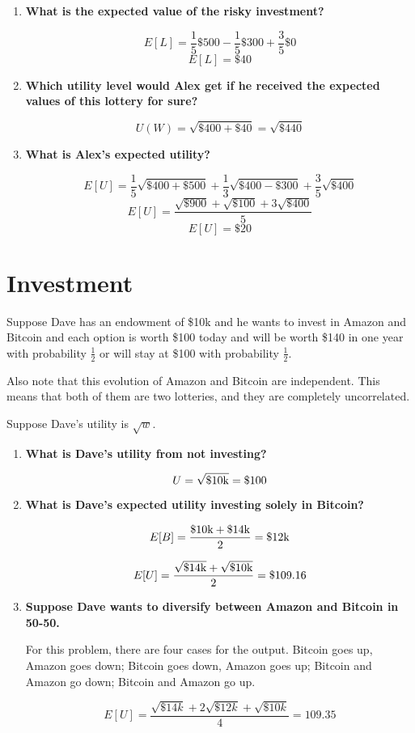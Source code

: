 \documentclass{article}
\begin{document}
\begin{enumerate}
    \item \textbf{What is the expected value of the risky investment?}

        $$E[L] = \frac{1}{5} \$500 - \frac{1}{5} \$300 + \frac{3}{5} \$0$$
        $$E[L] = \$40$$

    \item \textbf{Which utility level would Alex get if he received the expected
        values of this lottery for sure?}

        $$U(W) = \sqrt{\$400 + \$40} = \sqrt{\$440}$$

    \item \textbf{What is Alex's expected utility?}

        $$E[U] = \frac{1}{5} \sqrt{\$400 + \$500} + \frac{1}{3} \sqrt{\$400 -
        \$300} + \frac{3}{5} \sqrt{\$400}$$
        $$E[U] = \frac{\sqrt{\$900} + \sqrt{\$100} + 3\sqrt{\$400}}{5}$$
        $$E[U] = \$20$$

\end{enumerate}

\section{Investment}

Suppose Dave has an endowment of \$10k and he wants to invest in Amazon and
Bitcoin and each option is worth \$100 today and will be worth \$140 in one year
with probability $\frac{1}{2}$ or will stay at \$100 with probability
$\frac{1}{2}$.

Also note that this evolution of Amazon and Bitcoin are independent. This means
that both of them are two lotteries, and they are completely uncorrelated.

Suppose Dave's utility is $\sqrt{w}$.

\begin{enumerate}
    \item \textbf{What is Dave's utility from not investing?}

        $$U = \sqrt{\$10\rm{k}} = \$100$$

    \item \textbf{What is Dave's expected utility investing solely in Bitcoin?}

        $$E[B] = \frac{\$10\rm{k} + \$14\rm{k}}{2} = \$12\rm{k}$$

        $$E[U] = \frac{\sqrt{\$14\rm{k}} + \sqrt{\$10\rm{k}}}{2} = \$109.16$$

    \item \textbf{Suppose Dave wants to diversify between Amazon and Bitcoin in
        50-50.}

        For this problem, there are four cases for the output. Bitcoin goes up,
        Amazon goes down; Bitcoin goes down, Amazon goes up; Bitcoin and Amazon
        go down; Bitcoin and Amazon go up.

        $$E[U] = \frac{\sqrt{\$14k} + 2\sqrt{\$12k} + \sqrt{\$10k}}{4} = 109.35$$

\end{enumerate}
\end{document}
